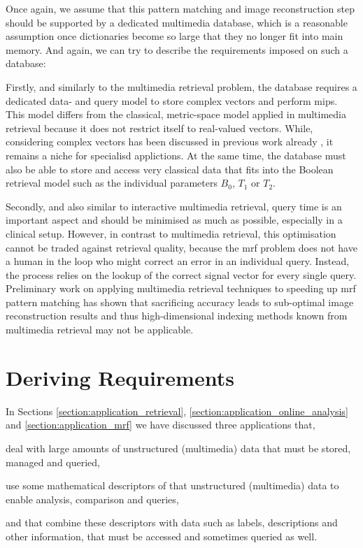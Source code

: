 Once again, we assume that this pattern matching and image reconstruction step should be supported by a dedicated multimedia database, which is a reasonable assumption once dictionaries become so large that they no longer fit into main memory. And again, we can try to describe the requirements imposed on such a database: 

Firstly, and similarly to the multimedia retrieval problem, the database requires a dedicated data- and query model to store complex vectors and perform \acrshort{mips}. This model differs from the classical, metric-space model applied in multimedia retrieval because it does not restrict itself to real-valued vectors. While, considering complex vectors has been discussed in previous work already \cite{Rafiei:1997Similarity}, it remains a niche for specialisd applictions. At the same time, the database must also be able to store and access very classical data that fits into the Boolean retrieval model such as the individual parameters $B_0$, $T_1$ or $T_2$. 

Secondly, and also similar to interactive multimedia retrieval, query time is an important aspect and should be minimised as much as possible, especially in a clinical setup. However, in contrast to multimedia retrieval, this optimisation cannot be traded against retrieval quality, because the \acrshort{mrf} problem does not have a human in the loop who might correct an error in an individual query. Instead, the process relies on the lookup of the correct signal vector for every single query. Preliminary work on applying multimedia retrieval techniques to speeding up \acrshort{mrf} pattern matching has shown that sacrificing accuracy leads to sub-optimal image reconstruction results \cite{Huerbin:2020Retrieval,Zihlmann:2021Magnetic} and thus high-dimensional indexing methods known from multimedia retrieval may not be applicable.

\section{Deriving Requirements}
\label{section:requirements}
In Sections \ref{section:application_retrieval}, \ref{section:application_online_analysis} and \ref{section:application_mrf} we have discussed three applications that, 
\begin{enumerate*}[label=(\roman*)]
    \item deal with large amounts of unstructured (multimedia) data that must be stored, managed and queried,
    \item use some mathematical descriptors of that unstructured (multimedia) data to enable analysis, comparison and queries,
    \item and that combine these descriptors with data such as labels, descriptions and other information, that must be accessed and sometimes queried as well.
\end{enumerate*}

